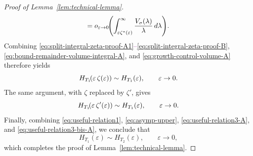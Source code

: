 \documentclass[a4paper,12pt]{article}
\let\originalleft\left
\let\originalright\right
\renewcommand{\left}{\mathopen{}\mathclose\bgroup\originalleft}
\renewcommand{\right}{\aftergroup\egroup\originalright}
\begin{document}
\begin{proof}[Proof of Lemma~\ref{lem:technical-lemma}]
\begin{equation}
=
o_{\varepsilon\to0}\!\left(
\int_{\varepsilon\zeta^*(\varepsilon)}^\infty
\frac{V_\sigma(\lambda)}{\lambda}\,d\lambda
\right).
\end{equation}
Combining
\textcolor{purple}{\eqref{eq:split-integral-zeta-proof-A1}--\eqref{eq:split-integral-zeta-proof-B}},
\eqref{eq:bound-remainder-volume-integral-A},
and \eqref{eq:growth-control-volume-A} therefore yields
\begin{equation}\label{eq:useful-relation3-A}
H_{T_1}\!\left(\varepsilon\,\zeta(\varepsilon)\right)
\sim
H_{T_1}(\varepsilon),
\qquad \varepsilon\to0 .
\end{equation}
The same argument, with $\zeta$ replaced by $\zeta'$, gives
\begin{equation}\label{eq:useful-relation3-bis-A}
H_{T_1}\!\left(\varepsilon\,\zeta'(\varepsilon)\right)
\sim
H_{T_1}(\varepsilon),
\qquad \varepsilon\to0 .
\end{equation}
Finally, combining
\eqref{eq:useful-relation1},
\eqref{eq:asymp-upper},
\eqref{eq:useful-relation3-A},
and \eqref{eq:useful-relation3-bis-A},
we conclude that
\[
H_{T_1}(\varepsilon)
\sim
H_{T_2}(\varepsilon),
\qquad \varepsilon\to0,
\]
which completes the proof of Lemma~\ref{lem:technical-lemma}.
\end{proof}
\end{document}
